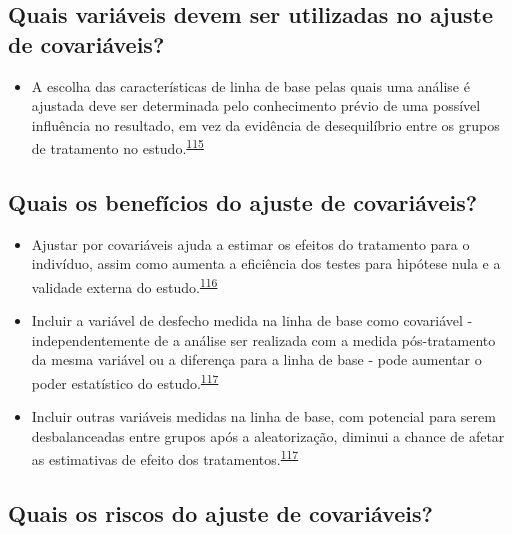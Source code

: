 \documentclass[
]{book}
\providecommand{\tightlist}{%
  \setlength{\itemsep}{0pt}\setlength{\parskip}{0pt}}
\begin{document}
\hypertarget{quais-variuxe1veis-devem-ser-utilizadas-no-ajuste-de-covariuxe1veis}{%
\subsection{Quais variáveis devem ser utilizadas no ajuste de covariáveis?}\label{quais-variuxe1veis-devem-ser-utilizadas-no-ajuste-de-covariuxe1veis}}

\begin{itemize}
\tightlist
\item
  A escolha das características de linha de base pelas quais uma análise é ajustada deve ser determinada pelo conhecimento prévio de uma possível influência no resultado, em vez da evidência de desequilíbrio entre os grupos de tratamento no estudo.\textsuperscript{\protect\hyperlink{ref-roberts1999}{115}}
\end{itemize}

\hypertarget{quais-os-benefuxedcios-do-ajuste-de-covariuxe1veis}{%
\subsection{Quais os benefícios do ajuste de covariáveis?}\label{quais-os-benefuxedcios-do-ajuste-de-covariuxe1veis}}

\begin{itemize}
\item
  Ajustar por covariáveis ajuda a estimar os efeitos do tratamento para o indivíduo, assim como aumenta a eficiência dos testes para hipótese nula e a validade externa do estudo.\textsuperscript{\protect\hyperlink{ref-Hauck1998}{116}}
\item
  Incluir a variável de desfecho medida na linha de base como covariável - independentemente de a análise ser realizada com a medida pós-tratamento da mesma variável ou a diferença para a linha de base - pode aumentar o poder estatístico do estudo.\textsuperscript{\protect\hyperlink{ref-Kahan2014}{117}}
\item
  Incluir outras variáveis medidas na linha de base, com potencial para serem desbalanceadas entre grupos após a aleatorização, diminui a chance de afetar as estimativas de efeito dos tratamentos.\textsuperscript{\protect\hyperlink{ref-Kahan2014}{117}}
\end{itemize}

\hypertarget{quais-os-riscos-do-ajuste-de-covariuxe1veis}{%
\subsection{Quais os riscos do ajuste de covariáveis?}\label{quais-os-riscos-do-ajuste-de-covariuxe1veis}}
\end{document}
